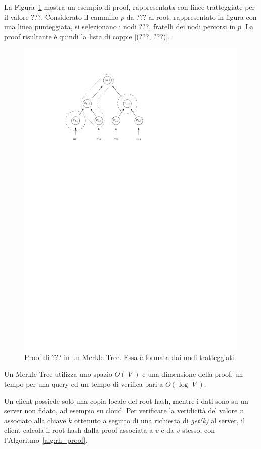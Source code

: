 La Figura~\ref{fig:mht_proof} mostra un esempio di proof, rappresentata con linee tratteggiate per il valore ???. Considerato il cammino $p$ da ??? al root, rappresentato in figura con una linea punteggiata, si selezionano i nodi ???, fratelli dei nodi percorsi in $p$. La proof risultante è quindi la lista di coppie [(???, ???)].

\begin{figure}
	\centering
	\includegraphics{img/capuno/proof.pdf}
	\caption{Proof di ??? in un Merkle Tree. Essa è formata dai nodi tratteggiati.}
	\label{fig:mht_proof}
\end{figure}

Un Merkle Tree utilizza uno spazio $O(|V|)$ e una dimensione della proof, un tempo per una query ed un tempo di verifica pari a $O(\log{|V|})$.

Un client possiede solo una copia locale del root-hash, mentre i dati sono su un server non fidato, ad esempio su cloud. Per verificare la veridicità del valore $v$ associato alla chiave $k$ ottenuto a seguito di una richiesta di \emph{get(k)} al server, il client calcola il root-hash dalla proof associata a $v$ e da $v$ stesso, con l'Algoritmo~\ref{alg:rh_proof}.

